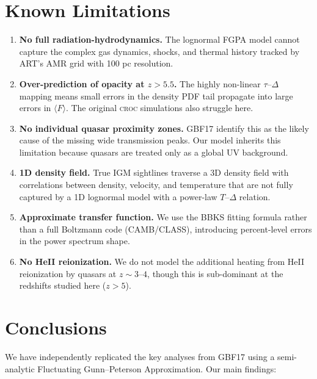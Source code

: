 \documentclass[11pt]{article}
\newcommand{\croc}{\textsc{croc}}
\begin{document}
\section{Known Limitations}

\begin{enumerate}[leftmargin=*]
    \item \textbf{No full radiation-hydrodynamics.} The lognormal FGPA model cannot capture the complex gas dynamics, shocks, and thermal history tracked by ART's AMR grid with 100 pc resolution.

    \item \textbf{Over-prediction of opacity at $z > 5.5$.} The highly non-linear $\tau$--$\Delta$ mapping means small errors in the density PDF tail propagate into large errors in $\langle F \rangle$. The original \croc{} simulations also struggle here.

    \item \textbf{No individual quasar proximity zones.} GBF17 identify this as the likely cause of the missing wide transmission peaks. Our model inherits this limitation because quasars are treated only as a global UV background.

    \item \textbf{1D density field.} True IGM sightlines traverse a 3D density field with correlations between density, velocity, and temperature that are not fully captured by a 1D lognormal model with a power-law $T$--$\Delta$ relation.

    \item \textbf{Approximate transfer function.} We use the BBKS fitting formula rather than a full Boltzmann code (CAMB/CLASS), introducing percent-level errors in the power spectrum shape.

    \item \textbf{No HeII reionization.} We do not model the additional heating from HeII reionization by quasars at $z \sim 3$--$4$, though this is sub-dominant at the redshifts studied here ($z > 5$).
\end{enumerate}

\section{Conclusions}

We have independently replicated the key analyses from GBF17 using a semi-analytic Fluctuating Gunn--Peterson Approximation. Our main findings:
\end{document}
